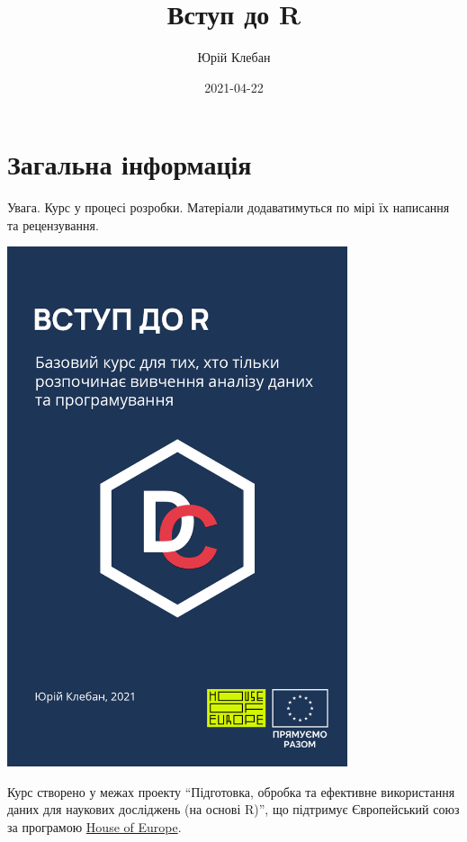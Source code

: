 \documentclass[
]{book}
\title{Вступ до R}
\author{Юрій Клебан}
\date{2021-04-22}
\begin{document}
\maketitle

{
\setcounter{tocdepth}{1}
\tableofcontents
}
\hypertarget{ux437ux430ux433ux430ux43bux44cux43dux430-ux456ux43dux444ux43eux440ux43cux430ux446ux456ux44f}{%
\chapter*{Загальна інформація}\label{ux437ux430ux433ux430ux43bux44cux43dux430-ux456ux43dux444ux43eux440ux43cux430ux446ux456ux44f}}

Увага. Курс у процесі розробки. Матеріали додаватимуться по мірі їх написання та рецензування.

\includegraphics[width=0.75\textwidth,height=\textheight]{images/cover.png}

Курс створено у межах проекту ``Підготовка, обробка та ефективне використання даних для наукових досліджень (на основі R)'', що підтримує Європейський союз за програмою \href{https://houseofeurope.org.ua/}{House of Europe}.
\end{document}
